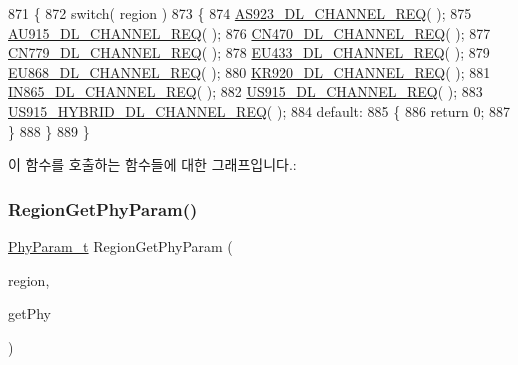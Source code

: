 \begin{DoxyCode}
871 \{
872     \textcolor{keywordflow}{switch}( region )
873     \{
874         \mbox{\hyperlink{_region_8c_ab3da3232202dfe0cc690177f70fb1a2e}{AS923\_DL\_CHANNEL\_REQ}}( );
875         \mbox{\hyperlink{_region_8c_ae3d382c3fe0a920ebbe45ed151c8e68f}{AU915\_DL\_CHANNEL\_REQ}}( );
876         \mbox{\hyperlink{_region_8c_aad78d0f78195e1ea67a08d88e558b5d6}{CN470\_DL\_CHANNEL\_REQ}}( );
877         \mbox{\hyperlink{_region_8c_a9f660886c5ac764763d3ef04f06b18e1}{CN779\_DL\_CHANNEL\_REQ}}( );
878         \mbox{\hyperlink{_region_8c_a7901af3a15fcd0b1f4c441f954707a65}{EU433\_DL\_CHANNEL\_REQ}}( );
879         \mbox{\hyperlink{_region_8c_ab3cd0c5f292d0430e6c9bff2e335ffc4}{EU868\_DL\_CHANNEL\_REQ}}( );
880         \mbox{\hyperlink{_region_8c_a053b7e61a2eca94300e2e10a3ab772ee}{KR920\_DL\_CHANNEL\_REQ}}( );
881         \mbox{\hyperlink{_region_8c_a358201e425669601c25c7cdb157808f2}{IN865\_DL\_CHANNEL\_REQ}}( );
882         \mbox{\hyperlink{_region_8c_a41b21067e184934051613bdf600c03f4}{US915\_DL\_CHANNEL\_REQ}}( );
883         \mbox{\hyperlink{_region_8c_aef9ac229d0887516edae8f76692f02af}{US915\_HYBRID\_DL\_CHANNEL\_REQ}}( );
884         \textcolor{keywordflow}{default}:
885         \{
886             \textcolor{keywordflow}{return} 0;
887         \}
888     \}
889 \}
\end{DoxyCode}
이 함수를 호출하는 함수들에 대한 그래프입니다.\+:
\mbox{\label{group___r_e_g_i_o_n_gafbd084611ba512035a6cbe7f3aa5857b}} 
\subsubsection{\texorpdfstring{Region\+Get\+Phy\+Param()}{RegionGetPhyParam()}}
{\footnotesize\ttfamily \mbox{\hyperlink{group___r_e_g_i_o_n_gaed159b26e5c4677236b6e8677019db30}{Phy\+Param\+\_\+t}} Region\+Get\+Phy\+Param (\begin{DoxyParamCaption}\item[{\mbox{\hyperlink{group___l_o_r_a_m_a_c_ga80c48efda9ae02e14b58160d34a798dd}{Lo\+Ra\+Mac\+Region\+\_\+t}}}]{region,  }\item[{\mbox{\hyperlink{group___r_e_g_i_o_n_gab471483fff904f4f89bbc03f7fc380ab}{Get\+Phy\+Params\+\_\+t}} $\ast$}]{get\+Phy }\end{DoxyParamCaption})}




